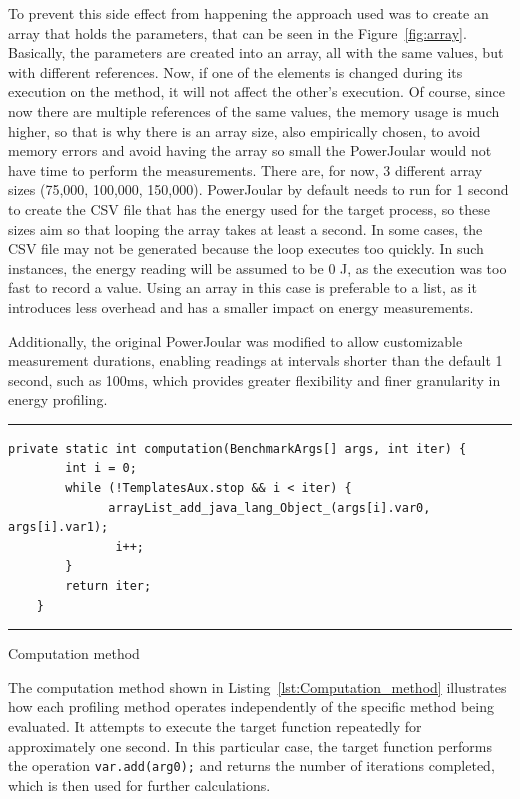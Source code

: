 To prevent this side effect from happening the approach used was to create an array that holds the parameters, that can be seen in the Figure~\ref{fig:array}. Basically, the parameters are created into an array, all with the same values, but with different references. Now, if one of the elements is changed during its execution on the method, it will not affect the other's execution. Of course, since now there are multiple references of the same values, the memory usage is much higher, so that is why there is an array size, also empirically chosen, to avoid memory errors and avoid having the array so small the PowerJoular would not have time to perform the measurements. There are, for now, 3 different array sizes (75,000, 100,000, 150,000). PowerJoular by default needs to run for 1 second to create the CSV file that has the energy used for the target process, so these sizes aim so that looping the array takes at least a second. In some cases, the CSV file may not be generated because the loop executes too quickly. In such instances, the energy reading will be assumed to be 0 J, as the execution was too fast to record a value. Using an array in this case is preferable to a list, as it introduces less overhead and has a smaller impact on energy measurements.

Additionally, the original PowerJoular was modified to allow customizable measurement durations, enabling readings at intervals shorter than the default 1 second, such as 100ms, which provides greater flexibility and finer granularity in energy profiling.


\begin{listing}[H]
\noindent\rule{\linewidth}{0.4pt}
\begin{verbatim}
private static int computation(BenchmarkArgs[] args, int iter) {
        int i = 0;
        while (!TemplatesAux.stop && i < iter) {
              arrayList_add_java_lang_Object_(args[i].var0, args[i].var1);
               i++;
        }
        return iter;
    }
\end{verbatim}
\noindent\rule{\linewidth}{0.4pt}
\caption{Computation method}            
\label{lst:Computation_method}
\end{listing}

The computation method shown in Listing~\ref{lst:Computation_method} illustrates how each profiling method operates independently of the specific method being evaluated. It attempts to execute the target function repeatedly for approximately one second. In this particular case, the target function performs the operation \texttt{var.add(arg0);} and returns the number of iterations completed, which is then used for further calculations.


